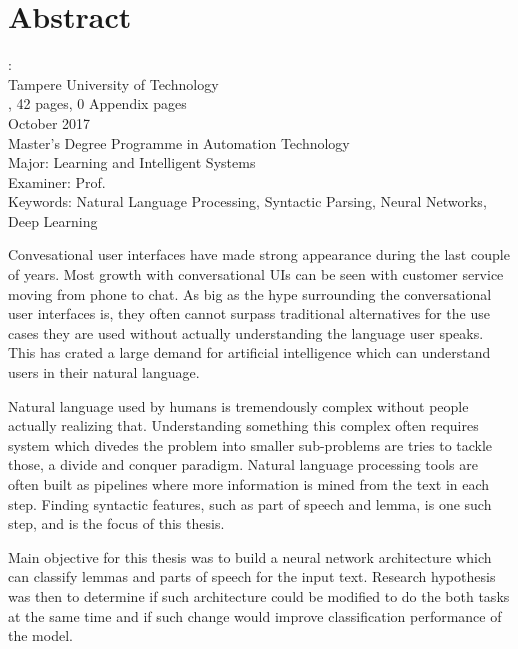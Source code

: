 \documentclass[12pt,a4paper,english
]{tutthesis}
\begin{document}
\chapter*{Abstract}

\begin{spacing}{1.0}
         {\bf \textsf{\MakeUppercase{\@author}}}: \@title\\   %
         \textsf{Tampere University of Technology}\\
         \textsf{\@thesistype, 42 pages, 0 Appendix pages} \\
         \textsf{October 2017}\\
         \textsf{Master's Degree Programme in Automation Technology}\\
         \textsf{Major: Learning and Intelligent Systems}\\
         \textsf{Examiner: Prof. \@examiner}\\ %
         \textsf{Keywords: Natural Language Processing, Syntactic Parsing, Neural Networks, Deep Learning}\\
\end{spacing}

Convesational user interfaces have made strong appearance during the last couple of years. Most growth with conversational UIs can be seen with customer service moving from phone to chat. As big as the hype surrounding the conversational user interfaces is, they often cannot surpass traditional alternatives for the use cases they are used without actually understanding the language user speaks. This has crated a large demand for artificial intelligence which can understand users in their natural language.

Natural language used by humans is tremendously complex without people actually realizing that. Understanding something this complex often requires system which divedes the problem into smaller sub-problems are tries to tackle those, a divide and conquer paradigm. Natural language processing tools are often built as pipelines where more information is mined from the text in each step. Finding syntactic features, such as part of speech and lemma,  is one such step, and is the focus of this thesis.

Main objective for this thesis was to build a neural network architecture which can classify lemmas and parts of speech for the input text. Research hypothesis was then to determine if such architecture could be modified to do the both tasks at the same time and if such change would improve classification performance of the model.
\end{document}
